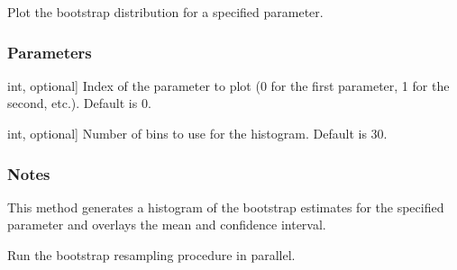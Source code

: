 \documentclass[a4paper,11pt,openany,english]{sphinxmanual}
\begin{document}
\begin{fulllineitems}

\begin{fulllineitems}
\label{\detokenize{api_bootstrap:xtremes.bootstrap.FullBootstrap.plot_bootstrap}}
\pysigstartsignatures
{}
\pysigstopsignatures
\sphinxAtStartPar
Plot the bootstrap distribution for a specified parameter.


\subsubsection{Parameters}
\label{\detokenize{api_bootstrap:id2}}\begin{description}
\sphinxlineitem{param\_idx}{[}int, optional{]}
\sphinxAtStartPar
Index of the parameter to plot (0 for the first parameter, 1 for the second, etc.). Default is 0.

\sphinxlineitem{bins}{[}int, optional{]}
\sphinxAtStartPar
Number of bins to use for the histogram. Default is 30.

\end{description}


\subsubsection{Notes}
\label{\detokenize{api_bootstrap:id3}}
\sphinxAtStartPar
This method generates a histogram of the bootstrap estimates for the specified parameter and overlays
the mean and confidence interval.

\end{fulllineitems}


\begin{fulllineitems}
\label{\detokenize{api_bootstrap:xtremes.bootstrap.FullBootstrap.run_bootstrap}}
\pysigstartsignatures
{}
\pysigstopsignatures
\sphinxAtStartPar
Run the bootstrap resampling procedure in parallel.


\end{fulllineitems}
\end{fulllineitems}
\end{document}
